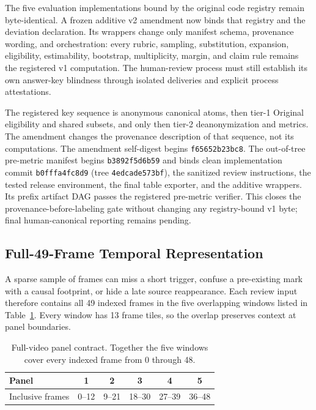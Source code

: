 The five evaluation implementations bound by the original code registry
remain byte-identical.  A frozen additive v2 amendment now binds that registry
and the deviation declaration.  Its wrappers change only manifest schema,
provenance wording, and orchestration: every rubric, sampling, substitution,
expansion, eligibility, estimability, bootstrap, multiplicity, margin, and
claim rule remains the registered v1 computation.  The human-review process
must still establish its own answer-key blindness through isolated deliveries
and explicit process attestations.

The registered key sequence is anonymous canonical atoms, then tier-1
Original eligibility and shared subsets, and only then tier-2 deanonymization
and metrics.  The amendment changes the provenance description of that
sequence, not its computations.
The amendment self-digest begins \texttt{f65652b23bc8}.  The out-of-tree
pre-metric manifest begins \texttt{b3892f5d6b59} and binds clean implementation
commit \texttt{b0fffa4fc8d9} (tree \texttt{4edcade573bf}), the sanitized
review instructions, the tested release environment, the final table
exporter, and the additive wrappers.  Its prefix artifact DAG passes the
registered pre-metric verifier.  This closes the provenance-before-labeling
gate without changing any registry-bound v1 byte; final human-canonical
reporting remains pending.

\subsection{Full-49-Frame Temporal Representation}
\label{app:temporal-panels}

A sparse sample of frames can miss a short trigger, confuse a pre-existing
mark with a causal footprint, or hide a late source reappearance.  Each review
input therefore contains all 49 indexed frames in the five overlapping
windows listed in Table~\ref{tab:temporal-panels}.  Every window has 13 frame
tiles, so the overlap preserves context at panel boundaries.

\begin{table}[H]
  \centering
  \caption{Full-video panel contract.  Together the five windows cover every
  indexed frame from 0 through 48.}
  \label{tab:temporal-panels}
  \small
  \begin{tabular}{@{}lccccc@{}}
    \toprule
    Panel & 1 & 2 & 3 & 4 & 5 \\
    \midrule
    Inclusive frames & 0--12 & 9--21 & 18--30 & 27--39 & 36--48 \\
    \bottomrule
  \end{tabular}
\end{table}

